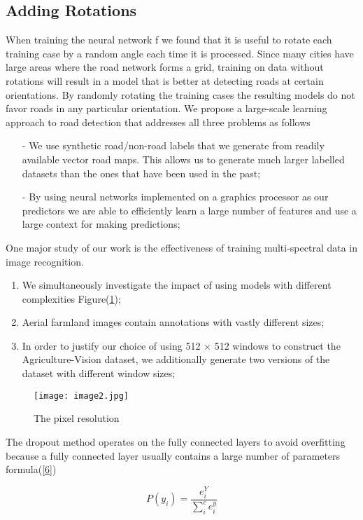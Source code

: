 \documentclass[12pt]{article}
\begin{document}
 \subsection{Adding Rotations}
\raggedright When training the neural network f we found that it is useful to rotate each training case by a random angle each time it is processed. Since many cities have large areas where the road network forms a grid, training on data without rotations will result in a model that is better at detecting roads at certain orientations. By randomly rotating the training cases the resulting models do not favor roads in any particular orientation.
\newline
We propose a large-scale learning approach to road detection that addresses all three problems as follows
 \begin{itemize}
    \item[-] We use synthetic road/non-road labels that we generate from readily available vector road maps. This allows us to generate much larger labelled datasets than the ones that have been used in the past;
    \item[-]By using neural networks implemented on a graphics processor as our predictors we are able to efficiently learn a large number of features and use a large context for making predictions;
\end{itemize}

One major study of our work is the effectiveness of training multi-spectral data in image recognition.
\begin{enumerate}
\item We simultaneously investigate the impact of using models with different complexities Figure(\ref{5});
\item Aerial farmland images contain annotations with vastly different sizes;
\item In order to justify our choice of using 512 × 512 windows to construct the Agriculture-Vision dataset, we additionally generate two versions of the dataset with different window sizes;
\end{enumerate}

\begin{figure}
        \centering
        \texttt{[image: image2.jpg]}
        \caption{The pixel resolution}
        \label{5}
    \end{figure}

\raggedright The dropout method operates on the fully connected layers to avoid overfitting because a fully connected layer usually contains a large number of parameters formula(\ref{6})

\begin{equation}
\label{6}
P(y_i)=\frac{e^Y_i}{\sum^c_i e^y_i}
\end{equation}
\end{document}

